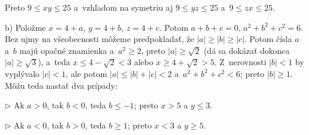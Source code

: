 {Preto $9\le xy\le 25$ a~vzhľadom na symetriu aj $9\le yz\le 25$ a~$9\le zx\le 25$.

\smallskip
b) Položme $x=4+a$, $y=4+b$, $z=4+c$. Potom $a+b+c=0$, $a^2+b^2+c^2=6$. Bez ujmy na všeobecnosti môžeme predpokladať, že
$|a|\ge|b|\ge|c|$. Potom čísla $a$ a~$b$ majú opačné znamienka a~$a^2\ge2$, preto $|a|\ge\sqrt2$\ifrozsirenevzoraky{} (dá sa dokázať dokonca $|a|\ge\sqrt3$)\fi, a~teda
$x\le 4-\sqrt2<3$ alebo $x\ge 4+\sqrt2>5$. Z~nerovnosti $|b|<1$ by vyplývalo $|c|<1$, ale potom $|a|\le|b|+|c|<2$ a~$a^2+b^2+c^2<6$; preto $|b|\ge1$.
Môžu teda nastať dva prípady:

\item{$\triangleright$} Ak $a>0$, tak $b<0$, teda $b\le-1$; preto $x>5$ a $y\le3$.
\item{$\triangleright$} Ak $a<0$, tak $b>0$, teda $b\ge1$; preto $x<3$ a $y\ge5$.
}

